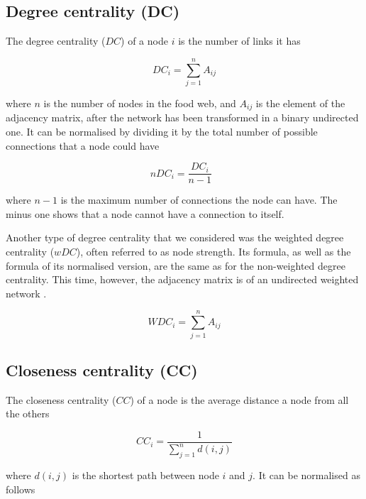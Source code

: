 \documentclass[twocolumn]{article}
\begin{document}
	\subsection*{Degree centrality (DC)}

		The degree centrality ($DC$) of a node $i$ is the number of links it has \citep{Wasserman1994}

					\begin{equation}
								DC_i=\sum_{j=1}^{n}A_{ij}
					\end{equation}

		\noindent where $n$ is the number of nodes in the food web, and $A_{ij}$ is the element of the adjacency matrix, after the network has been transformed in a binary undirected one. It can be normalised by dividing it by the total number of possible connections that a node could have \citep{Wasserman1994}

					\begin{equation}
								nDC_i=\frac{DC_i}{n-1}\ \ \
					\end{equation}

		\noindent where $n-1$ is the maximum number of connections the node can have. The minus one shows that a node cannot have a connection to itself.

		Another type of degree centrality that we considered was the weighted degree centrality ($wDC$), often referred to as node strength. Its formula, as well as the formula of its normalised version, are the same as for the non-weighted degree centrality. This time, however, the adjacency matrix is of an undirected weighted network \citep{Fornito2016}.

					\begin{equation}
								WDC_i=\sum_{j=1}^{n}A_{ij}
					\end{equation}

	\subsection*{Closeness centrality (CC)}

		The closeness centrality ($CC$) of a node is the average distance a node from all the others \citep{Wasserman1994}

					\begin{equation}
								CC_i=\frac{1}{\sum\limits_{j=1}^n d(i,j)}
					\end{equation}

		\noindent where $d(i,j)$ is the shortest path between node $i$ and $j$. It can be normalised as follows \citep{Wasserman1994}
\end{document}
